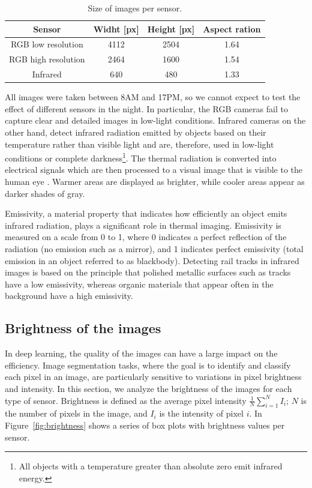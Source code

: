 \documentclass[Master,MDS,english]{BASE/twbook} %
\begin{document}
\begin{table}[h!]
\begin{center}
\begin{tabular}{|c| c c c|} 
  \hline
 Sensor &	Widht [px] &	Height [px] &	Aspect ration \\
 \hline
RGB low resolution &	4112 &	2504 &	1.64 \\
 \hline
RGB high resolution &	2464 &	1600 &	1.54 \\
 \hline
Infrared	& 640 &	480 &	1.33 \\
 \hline
\end{tabular}
\caption{Size of images per sensor.}
\label{tab:1}
\end{center}
\end{table}


All images were taken between 8AM and 17PM, so we cannot expect to test the effect of different sensors in the night. In particular, the RGB cameras fail to capture clear and detailed images in low-light conditions. 
Infrared cameras on the other hand, detect infrared radiation emitted by objects based on their temperature rather than visible light and are, therefore, used in low-light conditions or complete darkness\footnote{All objects with a temperature greater than absolute zero emit infrared energy.}. The thermal radiation is converted into electrical signals which are then processed to a visual image that is visible to the human eye \citep{CLARK200283}. Warmer areas are displayed as brighter, while cooler areas appear as darker shades of gray.

Emissivity, a material property that indicates how efficiently an object emits infrared radiation, plays a significant role in thermal imaging. Emissivity is measured on a scale from 0 to 1, where 0 indicates a perfect reflection of the radiation (no emission such as a mirror), and 1 indicates perfect emissivity (total emission in an object referred to as blackbody).  Detecting rail tracks in infrared images is based on the principle that polished metallic surfaces such as tracks have a low emissivity, whereas organic materials that appear often in the background have a high emissivity.  


\subsection{Brightness of the images}


In deep learning, the quality of the images can have a large impact on the efficiency. Image segmentation tasks, where the goal is to identify and classify each pixel in an image, are particularly sensitive to variations in pixel brightness and intensity.
In this section, we analyze the brightness of the images for each type of sensor. Brightness is defined as the average pixel intensity $\frac{1}{N} \sum_{i=1}^{N} I_i $; $N$ is the number of pixels in the image, and $I_i$ is the intensity of pixel $i$. In Figure~\ref{fig:brightness} shows a series of box plots with brightness values per sensor.
\end{document}
